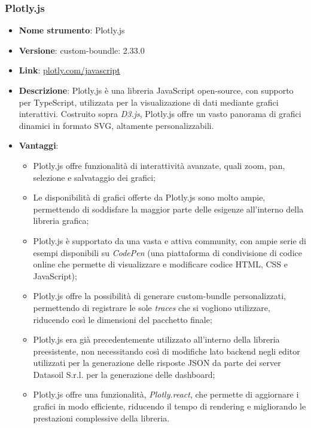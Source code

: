 \subsubsection{Plotly.js}
\begin{itemize}
\item \textbf{Nome strumento}: Plotly.js
\item \textbf{Versione}: custom-boundle: 2.33.0
\item \textbf{Link}: \href{https://plotly.com/javascript/}{plotly.com/javascript}
\item \textbf{Descrizione}: Plotly.js è una libreria JavaScript open-source, con supporto per TypeScript, utilizzata per la visualizazione di dati mediante grafici interattivi.
Costruito sopra \textit{D3.js}, Plotly.js offre un vasto panorama di grafici dinamici in formato SVG, altamente personalizzabili.
\item \textbf{Vantaggi}:
\begin{itemize}
      \item Plotly.js offre funzionalità di interattività avanzate, quali zoom, pan, selezione e salvataggio dei grafici;
      \item Le disponibilità di grafici offerte da Plotly.js sono molto ampie, permettendo di soddisfare la maggior parte delle esigenze
            all'interno della libreria grafica;
      \item Plotly.js è supportato da una vasta e attiva community, con ampie serie di esempi disponibili su \textit{CodePen} (una piattaforma di condivisione di codice
            online che permette di visualizzare e modificare codice HTML, CSS e JavaScript);
      \item Plotly.js offre la possibilità di generare custom-bundle personalizzati, permettendo di registrare le sole \textit{traces} che si vogliono utilizzare, riducendo
            così le dimensioni del pacchetto finale;
      \item Plotly.js era già precedentemente utilizzato all'interno della libreria preesistente, non necessitando così di modifiche lato backend negli editor
            utilizzati per la generazione delle risposte JSON da parte dei server Datasoil S.r.l. per la generazione delle dashboard;
      \item Plotly.js offre una funzionalità, \textit{Plotly.react}, che permette di aggiornare i grafici in modo efficiente, riducendo il tempo di rendering
            e migliorando le prestazioni complessive della libreria.
\end{itemize}

\end{itemize}
